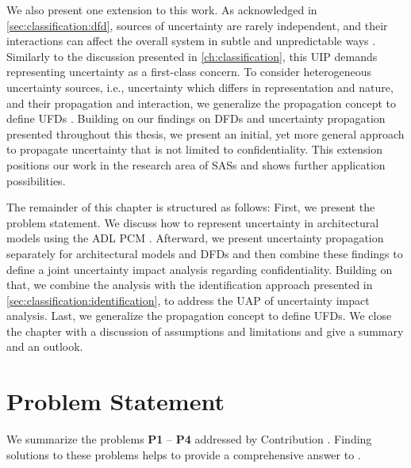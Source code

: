 We also present one extension to this work.
As acknowledged in \autoref{sec:classification:dfd}, sources of uncertainty are rarely independent, and their interactions can affect the overall system in subtle and unpredictable ways \cite{camara_uncertainty_2022}.
Similarly to the discussion presented in \autoref{ch:classification}, this \acf{UIP} demands representing uncertainty as a first-class concern.
To consider heterogeneous uncertainty sources, i.e., uncertainty which differs in representation and nature, and their propagation and interaction, we generalize the propagation concept to define \acfp{UFD} \cite{camara_uncertainty_2024}.
Building on our findings on \acfp{DFD} and uncertainty propagation presented throughout this thesis, we present an initial, yet more general approach to propagate uncertainty that is not limited to confidentiality.
This extension positions our work in the research area of \acfp{SAS} \cite{weyns_towards_2023} and shows further application possibilities.

The remainder of this chapter is structured as follows:
First, we present the problem statement.
We discuss how to represent uncertainty in architectural models using the \ac{ADL} \acf{PCM} \cite{reussner_modeling_2016}.
Afterward, we present uncertainty propagation separately for architectural models and \acp{DFD} and then combine these findings to define a joint uncertainty impact analysis regarding confidentiality.
Building on that, we combine the analysis with the identification approach presented in \autoref{sec:classification:identification}, to address the \acf{UAP} of uncertainty impact analysis.
Last, we generalize the propagation concept to define \acp{UFD}.
We close the chapter with a discussion of assumptions and limitations and give a summary and an outlook.






\section{Problem Statement}%
\label{sec:impactanalysis:problem}

We summarize the problems \textbf{P1} -- \textbf{P4} addressed by Contribution .
Finding solutions to these problems helps to provide a comprehensive answer to .

